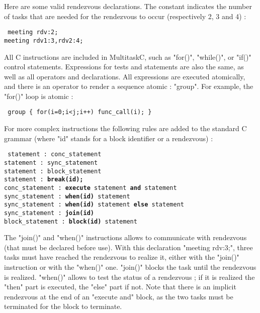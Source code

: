 \documentclass[10pt]{report}
\begin{document}
Here are some valid rendezvous declarations. The constant indicates the number of tasks that are needed for the rendezvous to
occur (respectively 2, 3 and 4) :

\begin{table}[h!]
\tt
\footnotesize
meeting rdv:2;\\
meeting rdv1:3,rdv2:4;\\
\end{table}

All C instructions are included in MultitaskC, such as "for()", "while()", or "if()" control statements. Expressions for
tests and statements are also the same, as well as all operators and declarations. All expressions are executed atomically, and
there is an operator to render a sequence atomic : "group". For example, the "for()" loop is atomic :

\begin{table}[h!]
\tt
\footnotesize
group \{ for(i=0;i<j;i++) func\_call(i); \}
\end{table}

For more complex instructions the following rules are added to the standard C grammar (where "id" stands for a block
identifier or a rendezvous) :

\begin{table}[h!]
\tt
\footnotesize
statement : conc\_statement\\
statement : sync\_statement\\
statement : block\_statement\\
statement : {\bf break(id);}\\
conc\_statement : {\bf execute} statement {\bf and} statement\\
sync\_statement : {\bf when(id)} statement\\
sync\_statement : {\bf when(id)} statement {\bf else} statement\\
sync\_statement : {\bf join(id)}\\
block\_statement : {\bf block(id)} statement\\
\end{table}

The "join()" and "when()" instructions allows to communicate with rendezvous (that must be declared before use).
With this declaration "meeting rdv:3;", three tasks must have reached the rendezvous to realize it, either with
the "join()" instruction or with the "when()" one. "join()" blocks the task until the rendezvous is realized. 
"when()" allows to test the status of a rendezvous ; if it is realized the "then" part is executed, the "else" part
if not. Note that there is an implicit rendezvous at the end of an "execute and" block, as the two tasks must
be terminated for the block to terminate.
\end{document}
